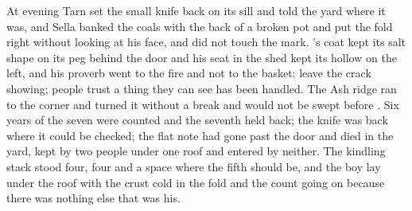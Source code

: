 At evening Tarn set the small knife back on its sill and told the yard where it was, and Sella banked the coals with the back of a broken pot and put the fold right without looking at his face, and did not touch the mark. 's coat kept its salt shape on its peg behind the door and his seat in the shed kept its hollow on the left, and his proverb went to the fire and not to the basket: leave the crack showing; people trust a thing they can see has been handled. The Ash ridge ran to the corner and turned it without a break and would not be swept before . Six years of the seven were counted and the seventh held back; the knife was back where it could be checked; the flat note had gone past the door and died in the yard, kept by two people under one roof and entered by neither. The kindling stack stood four, four and a space where the fifth should be, and the boy lay under the roof with the crust cold in the fold and the count going on because there was nothing else that was his.
